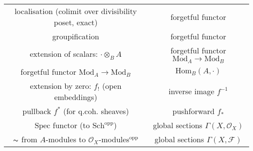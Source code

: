 \documentclass[12pt]{article}
\newcommand{\scr}[1]{\mathcal{#1}}
\newcommand{\Hom}{\mathrm{Hom}}
\newcommand{\spec}{\mathrm{Spec}}
\newcommand{\shf}{\mathscr{F}}
\begin{document}
\begin{center}
\begin{tabular}{|c| c|}
localisation (colimit over divisibility poset, exact) &  forgetful functor  \\
groupification & forgetful functor \\
extension of scalars: $\cdot \otimes_{B} A$ & forgetful functor $\mathrm{Mod}_{A} \to \mathrm{Mod}_{B}$ \\
forgetful functor $\mathrm{Mod}_{A} \to \mathrm{Mod}_{B}$ &  $\Hom_{B}(A, \cdot)$ \\
extension by zero: $f_{!}$ (open embeddings)  & inverse image $f^{-1}$ \\
pullback $f^{*}$ (for q.coh. sheaves) & pushforward $f_{*}$ \\
$\spec$ functor (to $\mathrm{Sch}^{\text{opp}}$) & global sections $\Gamma(X, \scr{O}_X)$ \\
$\thicksim$ from $A$-modules to $\scr{O}_X$-modules$^{\text{opp}}$ & global sections $\Gamma(X, \shf)$ \\
\hline
\end{tabular}
\end{center}
\end{document}
